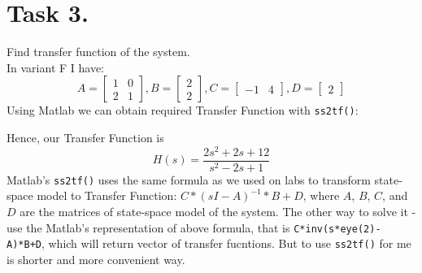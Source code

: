 \documentclass[a4paper,12pt]{article}
\begin{document}
\section{Task 3.}    
    Find transfer function of the system.\\
    In variant F I have:
    \begin{equation*}
        A = \begin{bmatrix}
             1 & 0\\
             2 & 1
        \end{bmatrix},
        B = \begin{bmatrix}
            2 \\ 2
        \end{bmatrix},
        C = \begin{bmatrix}
            -1 & 4
        \end{bmatrix},
        D = \begin{bmatrix}
            2
        \end{bmatrix}
    \end{equation*}
    Using Matlab we can obtain required Transfer Function with \texttt{ss2tf()}:
    
    Hence, our Transfer Function is
    \begin{equation*}
        H(s) = \frac{2s^2 + 2s + 12}{s^2-2s+1}
    \end{equation*} 
    Matlab's \texttt{ss2tf()} uses the same formula as we used on labs to 
    transform state-space model to Transfer Function: $C*(sI-A)^{-1}*B+D$, 
    where $A$, $B$, $C$, and $D$ are the matrices of state-space model of the 
    system. The other way to solve it - use the Matlab's representation of 
    above formula, that is \texttt{C*inv(s*eye(2)-A)*B+D}, which will return 
    vector of transfer fucntions. But to use \texttt{ss2tf()} for me is shorter 
    and more convenient way.\\
\end{document}
